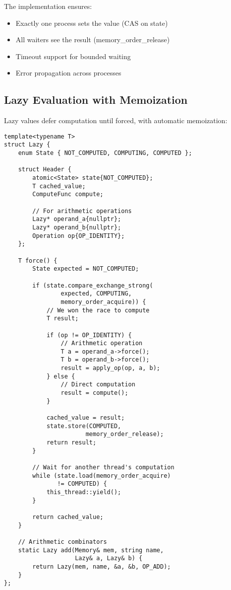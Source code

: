 \documentclass[letterpaper,twocolumn,10pt]{article}
\begin{document}
The implementation ensures:
\begin{itemize}
\item Exactly one process sets the value (CAS on state)
\item All waiters see the result (memory\_order\_release)
\item Timeout support for bounded waiting
\item Error propagation across processes
\end{itemize}

\subsection{Lazy Evaluation with Memoization}

Lazy values defer computation until forced, with automatic memoization:

\begin{lstlisting}[caption={Lazy Computation with Arithmetic}]
template<typename T>
struct Lazy {
    enum State { NOT_COMPUTED, COMPUTING, COMPUTED };
    
    struct Header {
        atomic<State> state{NOT_COMPUTED};
        T cached_value;
        ComputeFunc compute;
        
        // For arithmetic operations
        Lazy* operand_a{nullptr};
        Lazy* operand_b{nullptr};
        Operation op{OP_IDENTITY};
    };
    
    T force() {
        State expected = NOT_COMPUTED;
        
        if (state.compare_exchange_strong(
                expected, COMPUTING,
                memory_order_acquire)) {
            // We won the race to compute
            T result;
            
            if (op != OP_IDENTITY) {
                // Arithmetic operation
                T a = operand_a->force();
                T b = operand_b->force();
                result = apply_op(op, a, b);
            } else {
                // Direct computation
                result = compute();
            }
            
            cached_value = result;
            state.store(COMPUTED, 
                       memory_order_release);
            return result;
        }
        
        // Wait for another thread's computation
        while (state.load(memory_order_acquire) 
               != COMPUTED) {
            this_thread::yield();
        }
        
        return cached_value;
    }
    
    // Arithmetic combinators
    static Lazy add(Memory& mem, string name,
                    Lazy& a, Lazy& b) {
        return Lazy(mem, name, &a, &b, OP_ADD);
    }
};
\end{lstlisting}
\end{document}
